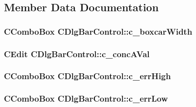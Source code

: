\subsection{Member Data Documentation}
\hypertarget{classCDlgBarControl_a8e1a9142314753e6c4391c544c1509ea}{
\subsubsection[{c\_\-boxcarWidth}]{\setlength{\rightskip}{0pt plus 5cm}CComboBox {\bf CDlgBarControl::c\_\-boxcarWidth}}}
\label{classCDlgBarControl_a8e1a9142314753e6c4391c544c1509ea}
\hypertarget{classCDlgBarControl_a992187e820dd20039d1a3f9a0be0a2be}{
\subsubsection[{c\_\-concAVal}]{\setlength{\rightskip}{0pt plus 5cm}CEdit {\bf CDlgBarControl::c\_\-concAVal}}}
\label{classCDlgBarControl_a992187e820dd20039d1a3f9a0be0a2be}
\hypertarget{classCDlgBarControl_aad8e57d5814a4007d7e8334c9b744df0}{
\subsubsection[{c\_\-errHigh}]{\setlength{\rightskip}{0pt plus 5cm}CComboBox {\bf CDlgBarControl::c\_\-errHigh}}}
\label{classCDlgBarControl_aad8e57d5814a4007d7e8334c9b744df0}
\hypertarget{classCDlgBarControl_ac978dbf692c08e28165aff70df5086a7}{
\subsubsection[{c\_\-errLow}]{\setlength{\rightskip}{0pt plus 5cm}CComboBox {\bf CDlgBarControl::c\_\-errLow}}}
